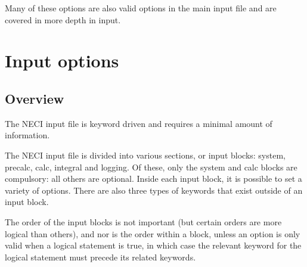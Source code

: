 \documentclass[openany,a4paper,10pt,english]{manual}
\begin{document}
Many of these options are also valid options in the main input file and are covered in
more depth in input.

\resetcurrentobjects
\hypertarget{--doc-input/index}{}

\hypertarget{input-index}{}\chapter{Input options}

\resetcurrentobjects
\hypertarget{--doc-input/overview}{}

\hypertarget{input-overview}{}\section{Overview}

The NECI input file is keyword driven and requires a minimal amount of information.

The NECI input file is divided into various sections, or input blocks: system, precalc, calc, integral and logging.  Of these, only the system and calc blocks are compulsory: all others are optional.  Inside each input block, it is possible to set a variety of options.  There are also three types of keywords that exist outside of an input block.

The order of the input blocks is not important (but certain orders are more logical than others), and nor is the order within a block, unless an option is only valid when a logical statement is true, in which case the relevant keyword for the logical statement must precede its related keywords.
\end{document}
